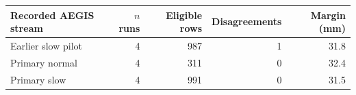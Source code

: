 \begin{tabularx}{\textwidth}{lrrrr}
\toprule
Recorded AEGIS stream & $n$ runs & Eligible rows & Disagreements & Margin (mm)\\
\midrule
Earlier slow pilot & 4 & 987 & 1 & 31.8\\
Primary normal & 4 & 311 & 0 & 32.4\\
Primary slow & 4 & 991 & 0 & 31.5\\
\bottomrule
\end{tabularx}
